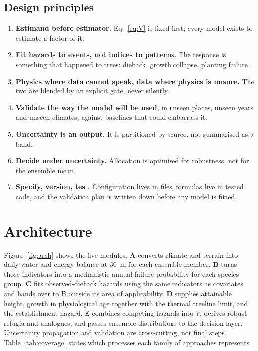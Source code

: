 \subsection{Design principles}
\begin{enumerate}
\item \textbf{Estimand before estimator.} Eq.~\eqref{eq:V} is fixed first; every model exists to estimate a factor of it.
\item \textbf{Fit hazards to events, not indices to patterns.} The response is something that happened to trees: dieback, growth collapse, planting failure.
\item \textbf{Physics where data cannot speak, data where physics is unsure.} The two are blended by an explicit gate, never silently.
\item \textbf{Validate the way the model will be used}, in unseen places, unseen years and unseen climates, against baselines that could embarrass it.
\item \textbf{Uncertainty is an output.} It is partitioned by source, not summarised as a band.
\item \textbf{Decide under uncertainty.} Allocation is optimised for robustness, not for the ensemble mean.
\item \textbf{Specify, version, test.} Configuration lives in files, formulas live in tested code, and the validation plan is written down before any model is fitted.
\end{enumerate}

\section{Architecture}\label{sec:arch}
Figure~\ref{fig:arch} shows the five modules. \textbf{A} converts climate and terrain into daily water and energy balance at 30~m for each ensemble member. \textbf{B} turns those indicators into a mechanistic annual failure probability for each species group. \textbf{C} fits observed-dieback hazards using the same indicators as covariates and hands over to B outside its area of applicability. \textbf{D} supplies attainable height, growth in physiological age together with the thermal treeline limit, and the establishment hazard. \textbf{E} combines competing hazards into $V$, derives robust refugia and analogues, and passes ensemble distributions to the decision layer. Uncertainty propagation and validation are cross-cutting, not final steps. Table~\ref{tab:coverage} states which processes each family of approaches represents.

